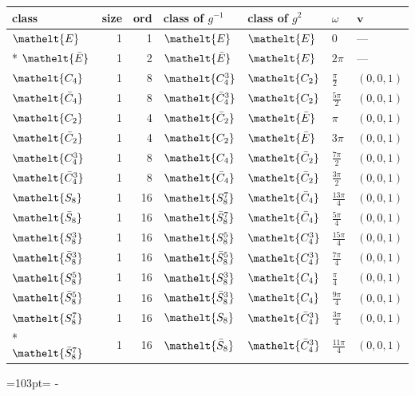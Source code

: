\documentclass[10pt,a4paper]{article}
\newcommand{\needspace}[1]{\par\penalty-100\begingroup\dimen0=#1\relax\dimen2=\pagegoal
  \advance\dimen2-\pagetotal\ifdim\dimen0>\dimen2\relax\ifdim\dimen2>0pt\vfil\break\fi\fi
  \endgroup}
\numberwithin{equation}{section}
\newcommand{\eltfont}[1]{{\let\sigma\eltsigma\mathelt{#1}}}
\newcommand{\cls}[1]{\eltfont{#1}}
\newcommand{\dirvec}[3]{(#1, #2, #3)}
\newcommand{\vv}{\mathbf{v}}
\newcommand{\barred}[1]{\bar{#1}}
\begin{document}
{\renewcommand{\arraystretch}{1.3}\begin{longtable}{@{}lrrllll@{}}\toprule
class & size & ord & class of $g^{-1}$ & class of $g^{2}$ & $\omega$ & $\vv$\\\midrule\endhead
\bottomrule\endfoot\endlastfoot
$\cls{E}$ & 1 & 1 & $\cls{E}$ & $\cls{E}$ & $0$ & ---\\*
$\cls{\barred{E}}$ & 1 & 2 & $\cls{\barred{E}}$ & $\cls{E}$ & $2\pi$ & ---\\
$\cls{C_{4}}$ & 1 & 8 & $\cls{C_{4}^{3}}$ & $\cls{C_{2}}$ & $\tfrac{\pi}{2}$ & $\dirvec{0}{0}{1}$\\
$\cls{\barred{C}_{4}}$ & 1 & 8 & $\cls{\barred{C}_{4}^{3}}$ & $\cls{C_{2}}$ & $\tfrac{5\pi}{2}$ & $\dirvec{0}{0}{1}$\\
$\cls{C_{2}}$ & 1 & 4 & $\cls{\barred{C}_{2}}$ & $\cls{\barred{E}}$ & $\pi$ & $\dirvec{0}{0}{1}$\\
$\cls{\barred{C}_{2}}$ & 1 & 4 & $\cls{C_{2}}$ & $\cls{\barred{E}}$ & $3\pi$ & $\dirvec{0}{0}{1}$\\
$\cls{C_{4}^{3}}$ & 1 & 8 & $\cls{C_{4}}$ & $\cls{\barred{C}_{2}}$ & $\tfrac{7\pi}{2}$ & $\dirvec{0}{0}{1}$\\
$\cls{\barred{C}_{4}^{3}}$ & 1 & 8 & $\cls{\barred{C}_{4}}$ & $\cls{\barred{C}_{2}}$ & $\tfrac{3\pi}{2}$ & $\dirvec{0}{0}{1}$\\
$\cls{S_{8}}$ & 1 & 16 & $\cls{S_{8}^{7}}$ & $\cls{\barred{C}_{4}}$ & $\tfrac{13\pi}{4}$ & $\dirvec{0}{0}{1}$\\
$\cls{\barred{S}_{8}}$ & 1 & 16 & $\cls{\barred{S}_{8}^{7}}$ & $\cls{\barred{C}_{4}}$ & $\tfrac{5\pi}{4}$ & $\dirvec{0}{0}{1}$\\
$\cls{S_{8}^{3}}$ & 1 & 16 & $\cls{S_{8}^{5}}$ & $\cls{C_{4}^{3}}$ & $\tfrac{15\pi}{4}$ & $\dirvec{0}{0}{1}$\\
$\cls{\barred{S}_{8}^{3}}$ & 1 & 16 & $\cls{\barred{S}_{8}^{5}}$ & $\cls{C_{4}^{3}}$ & $\tfrac{7\pi}{4}$ & $\dirvec{0}{0}{1}$\\
$\cls{S_{8}^{5}}$ & 1 & 16 & $\cls{S_{8}^{3}}$ & $\cls{C_{4}}$ & $\tfrac{\pi}{4}$ & $\dirvec{0}{0}{1}$\\
$\cls{\barred{S}_{8}^{5}}$ & 1 & 16 & $\cls{\barred{S}_{8}^{3}}$ & $\cls{C_{4}}$ & $\tfrac{9\pi}{4}$ & $\dirvec{0}{0}{1}$\\
$\cls{S_{8}^{7}}$ & 1 & 16 & $\cls{S_{8}}$ & $\cls{\barred{C}_{4}^{3}}$ & $\tfrac{3\pi}{4}$ & $\dirvec{0}{0}{1}$\\*
$\cls{\barred{S}_{8}^{7}}$ & 1 & 16 & $\cls{\barred{S}_{8}}$ & $\cls{\barred{C}_{4}^{3}}$ & $\tfrac{11\pi}{4}$ & $\dirvec{0}{0}{1}$\\
\bottomrule\end{longtable}}
\needspace{103pt}
\end{document}
